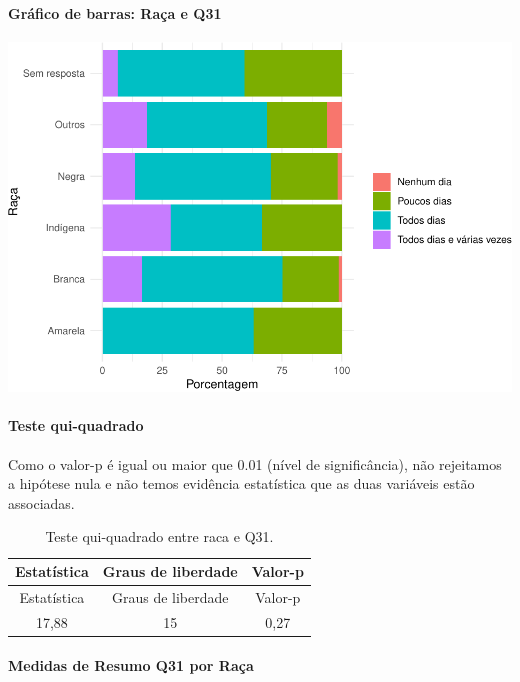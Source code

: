 \documentclass[]{article}
\let\oldparagraph\paragraph
\renewcommand{\paragraph}[1]{\oldparagraph{#1}\mbox{}}
\begin{document}
\hypertarget{gruxe1fico-de-barras-rauxe7a-e-q31}{%
\paragraph{Gráfico de barras: Raça e Q31}\label{gruxe1fico-de-barras-rauxe7a-e-q31}}

\begin{center}\includegraphics[width=0.75\linewidth]{relatorio_covid19_files/figure-latex/unnamed-chunk-1047-1} \end{center}

\hypertarget{teste-qui-quadrado-90}{%
\paragraph{Teste qui-quadrado}\label{teste-qui-quadrado-90}}

Como o valor-p é igual ou maior que 0.01 (nível de significância), não rejeitamos a hipótese nula e não temos evidência estatística que as duas variáveis estão associadas.

\begin{longtable}[]{@{}ccc@{}}
\caption{\label{tab:unnamed-chunk-1049}Teste qui-quadrado entre raca e Q31.}\tabularnewline
\toprule
Estatística & Graus de liberdade & Valor-p\tabularnewline
\midrule
\endfirsthead
\toprule
Estatística & Graus de liberdade & Valor-p\tabularnewline
\midrule
\endhead
17,88 & 15 & 0,27\tabularnewline
\bottomrule
\end{longtable}

\cleardoublepage

\hypertarget{medidas-de-resumo-q31-por-rauxe7a}{%
\paragraph{Medidas de Resumo Q31 por Raça}\label{medidas-de-resumo-q31-por-rauxe7a}}
\end{document}
